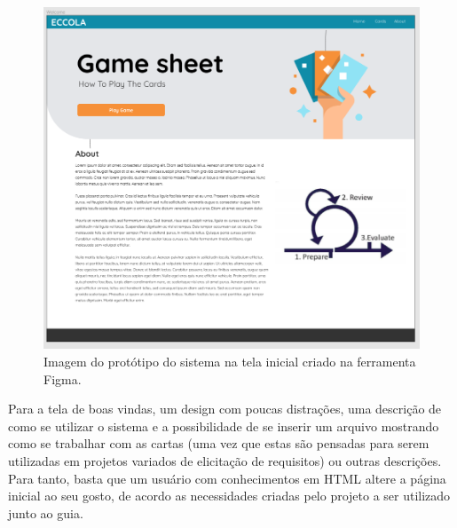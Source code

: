 \begin{figure}[h!]
    \centering
    \includegraphics[width=\textwidth]{img/figma_welcome.png}
    \caption{Imagem do protótipo do sistema na tela inicial criado na ferramenta Figma.}
    \label{fig:figma_welcome}
\end{figure}

Para a tela de boas vindas, um design com poucas distrações, uma descrição de como se utilizar o sistema e a possibilidade de se inserir um arquivo mostrando como se trabalhar com as cartas (uma vez que estas são pensadas para serem utilizadas em projetos variados de elicitação de requisitos) ou outras descrições. Para tanto, basta que um usuário com conhecimentos em HTML altere a página inicial ao seu gosto, de acordo as necessidades criadas pelo projeto a ser utilizado junto ao guia.

